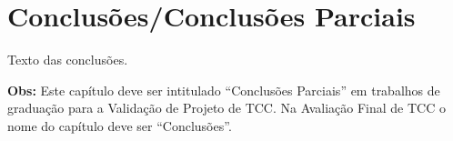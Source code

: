 \chapter{Conclusões/Conclusões Parciais}
\label{cap:05}

Texto das conclusões.

\textbf{Obs:} Este capítulo deve ser intitulado ``Conclusões Parciais'' em trabalhos de graduação para a Validação de Projeto de TCC. Na Avaliação Final de TCC o nome do capítulo deve ser ``Conclusões''.
